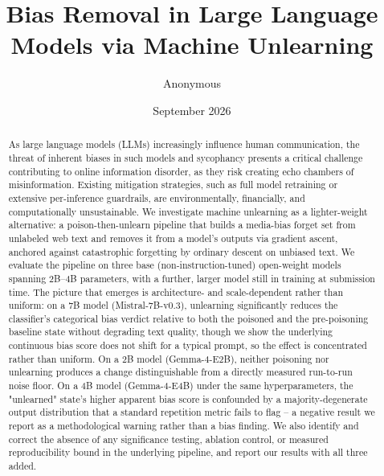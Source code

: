 \documentclass[runningheads]{llncs}
\begin{document}
\title{Bias Removal in Large Language Models via Machine Unlearning}
\author{Anonymous}
\date{September 2026}

\maketitle

\begin{abstract}
As large language models (LLMs) increasingly influence human communication, the threat of inherent biases in such models and sycophancy presents a critical challenge contributing to online information disorder, as they risk creating echo chambers of misinformation. Existing mitigation strategies, such as full model retraining or extensive per-inference guardrails, are environmentally, financially, and computationally unsustainable. We investigate machine unlearning as a lighter-weight alternative: a poison-then-unlearn pipeline that builds a media-bias forget set from unlabeled web text and removes it from a model's outputs via gradient ascent, anchored against catastrophic forgetting by ordinary descent on unbiased text. We evaluate the pipeline on three base (non-instruction-tuned) open-weight models spanning 2B--4B parameters, with a further, larger model still in training at submission time. The picture that emerges is architecture- and scale-dependent rather than uniform: on a 7B model (Mistral-7B-v0.3), unlearning significantly reduces the classifier's categorical bias verdict relative to both the poisoned and the pre-poisoning baseline state without degrading text quality, though we show the underlying continuous bias score does not shift for a typical prompt, so the effect is concentrated rather than uniform. On a 2B model (Gemma-4-E2B), neither poisoning nor unlearning produces a change distinguishable from a directly measured run-to-run noise floor. On a 4B model (Gemma-4-E4B) under the same hyperparameters, the "unlearned" state's higher apparent bias score is confounded by a majority-degenerate output distribution that a standard repetition metric fails to flag -- a negative result we report as a methodological warning rather than a bias finding. We also identify and correct the absence of any significance testing, ablation control, or measured reproducibility bound in the underlying pipeline, and report our results with all three added.

\end{abstract}
\end{document}
